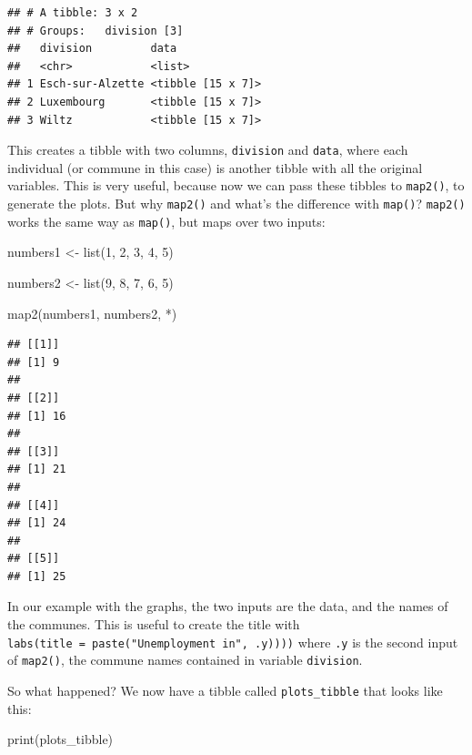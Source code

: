 \documentclass[
]{article}
\newenvironment{Shaded}{\begin{snugshade}}{\end{snugshade}}
\newcommand{\AttributeTok}[1]{\textcolor[rgb]{0.77,0.63,0.00}{#1}}
\newcommand{\DecValTok}[1]{\textcolor[rgb]{0.00,0.00,0.81}{#1}}
\newcommand{\FunctionTok}[1]{\textcolor[rgb]{0.00,0.00,0.00}{#1}}
\newcommand{\NormalTok}[1]{#1}
\newcommand{\OtherTok}[1]{\textcolor[rgb]{0.56,0.35,0.01}{#1}}
\newcommand{\StringTok}[1]{\textcolor[rgb]{0.31,0.60,0.02}{#1}}
\begin{document}
\begin{verbatim}
## # A tibble: 3 x 2
## # Groups:   division [3]
##   division         data             
##   <chr>            <list>           
## 1 Esch-sur-Alzette <tibble [15 x 7]>
## 2 Luxembourg       <tibble [15 x 7]>
## 3 Wiltz            <tibble [15 x 7]>
\end{verbatim}

This creates a tibble with two columns, \texttt{division} and \texttt{data}, where each individual (or
commune in this case) is another tibble with all the original variables. This is very useful,
because now we can pass these tibbles to \texttt{map2()}, to generate the plots. But why \texttt{map2()} and
what's the difference with \texttt{map()}? \texttt{map2()} works the same way as \texttt{map()}, but maps over two
inputs:

\begin{Shaded}
\begin{Highlighting}[]
\NormalTok{numbers1 }\OtherTok{\textless{}{-}} \FunctionTok{list}\NormalTok{(}\DecValTok{1}\NormalTok{, }\DecValTok{2}\NormalTok{, }\DecValTok{3}\NormalTok{, }\DecValTok{4}\NormalTok{, }\DecValTok{5}\NormalTok{)}

\NormalTok{numbers2 }\OtherTok{\textless{}{-}} \FunctionTok{list}\NormalTok{(}\DecValTok{9}\NormalTok{, }\DecValTok{8}\NormalTok{, }\DecValTok{7}\NormalTok{, }\DecValTok{6}\NormalTok{, }\DecValTok{5}\NormalTok{)}

\FunctionTok{map2}\NormalTok{(numbers1, numbers2, }\StringTok{\textasciigrave{}}\AttributeTok{*}\StringTok{\textasciigrave{}}\NormalTok{)}
\end{Highlighting}
\end{Shaded}

\begin{verbatim}
## [[1]]
## [1] 9
## 
## [[2]]
## [1] 16
## 
## [[3]]
## [1] 21
## 
## [[4]]
## [1] 24
## 
## [[5]]
## [1] 25
\end{verbatim}

In our example with the graphs, the two inputs are the data, and the names of the communes. This is
useful to create the title with \texttt{labs(title\ =\ paste("Unemployment\ in",\ .y))))} where \texttt{.y} is the
second input of \texttt{map2()}, the commune names contained in variable \texttt{division}.

So what happened? We now have a tibble called \texttt{plots\_tibble} that looks like this:

\begin{Shaded}
\begin{Highlighting}[]
\FunctionTok{print}\NormalTok{(plots\_tibble)}
\end{Highlighting}
\end{Shaded}
\end{document}
